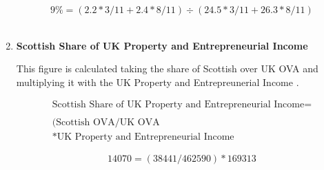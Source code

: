 \begin{enumerate}
\begin{equation} \nonumber
9\% = (2.2*3/11 + 2.4*8/11) \div (24.5*3/11 + 26.3*8/11)
\end{equation}\\


\item \textbf {Scottish Share of UK Property and Entrepreneurial Income}

This figure is calculated taking the share of Scottish over UK OVA \cite{ScotGov2013a, ONS2011c} and multiplying it with the UK Property and Entrepreunerial Income \cite{ONS2011c}.

\begin{equation}
\begin{split}
\text{Scottish Share of UK Property and Entrepreneurial Income} =  \\ \\
(\text{Scottish OVA} / \text{UK OVA}\\
*\text{UK Property and Entrepreneurial Income}
\end{split} \label{eq:2.5.88}
\end{equation}

\begin{equation} \nonumber
14070 = (38441/462590)*169313
\end{equation}\\


\end{enumerate}




